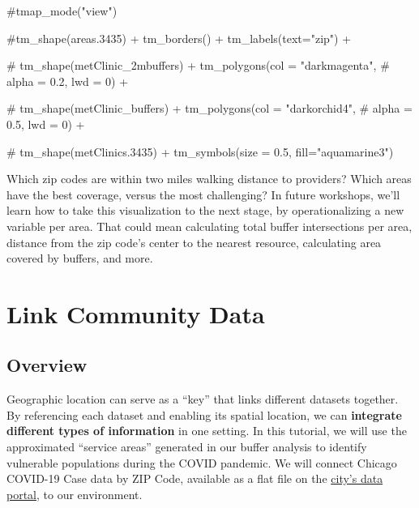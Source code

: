 \documentclass[
  letterpaper,
  DIV=11,
  numbers=noendperiod]{scrreprt}
\newenvironment{Shaded}{\begin{snugshade}}{\end{snugshade}}
\newcommand{\CommentTok}[1]{\textcolor[rgb]{0.37,0.37,0.37}{#1}}
\begin{document}
\begin{Shaded}
\begin{Highlighting}[]
\CommentTok{\#tmap\_mode("view")}

\CommentTok{\#tm\_shape(areas.3435) + tm\_borders() + tm\_labels(text="zip") + }
  
\CommentTok{\#  tm\_shape(metClinic\_2mbuffers) + tm\_polygons(col = "darkmagenta",}
\CommentTok{\#                                              alpha = 0.2, lwd = 0) + }
  
\CommentTok{\#    tm\_shape(metClinic\_buffers) + tm\_polygons(col = "darkorchid4",}
\CommentTok{\#                                              alpha = 0.5, lwd = 0) +}
  
\CommentTok{\#    tm\_shape(metClinics.3435) + tm\_symbols(size = 0.5, fill="aquamarine3")}
\end{Highlighting}
\end{Shaded}

Which zip codes are within two miles walking distance to providers?
Which areas have the best coverage, versus the most challenging? In
future workshops, we'll learn how to take this visualization to the next
stage, by operationalizing a new variable per area. That could mean
calculating total buffer intersections per area, distance from the zip
code's center to the nearest resource, calculating area covered by
buffers, and more.


\chapter{Link Community Data}\label{link-community-data}

\section{Overview}\label{overview-1}

Geographic location can serve as a ``key'' that links different datasets
together. By referencing each dataset and enabling its spatial location,
we can \textbf{integrate different types of information} in one setting.
In this tutorial, we will use the approximated ``service areas''
generated in our buffer analysis to identify vulnerable populations
during the COVID pandemic. We will connect Chicago COVID-19 Case data by
ZIP Code, available as a flat file on the
\href{https://data.cityofchicago.org/Health-Human-Services/COVID-19-Cases-Tests-and-Deaths-by-ZIP-Code/yhhz-zm2v}{city's
data portal}, to our environment.
\end{document}
